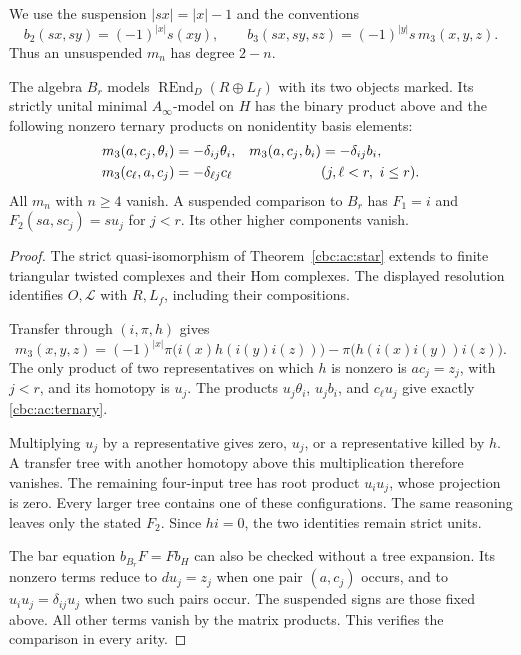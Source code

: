 We use the suspension $|sx|=|x|-1$ and the conventions
\[
 b_2(sx,sy)=(-1)^{|x|}s(xy),\qquad
 b_3(sx,sy,sz)=(-1)^{|y|}s\,m_3(x,y,z).
\]
Thus an unsuspended $m_n$ has degree $2-n$.

\begin{theorem}\label{cbc:ac:marked-model}
The algebra $B_r$ models
$\operatorname{REnd}_D(R\oplus L_f)$ with its two
objects marked. Its strictly unital minimal
$A_\infty$-model on $H$ has the binary product above
and the following nonzero ternary products on
nonidentity basis elements:
\begin{align}
 m_3(a,c_j,\theta_i)&=-\delta_{ij}\theta_i,&
 m_3(a,c_j,b_i)&=-\delta_{ij}b_i,\notag\\
 m_3(c_\ell,a,c_j)&=-\delta_{\ell j}c_\ell
        &&(j,\ell<r,\ i\leq r).
                  \label{cbc:ac:ternary}
\end{align}
All $m_n$ with $n\geq4$ vanish. A suspended comparison
to $B_r$ has $F_1=i$ and
$F_2(sa,sc_j)=su_j$ for $j<r$.
Its other higher components vanish.
\end{theorem}
\begin{proof}
The strict quasi-isomorphism of
Theorem~\ref{cbc:ac:star} extends to finite triangular
twisted complexes and their Hom complexes. The displayed
resolution identifies $O,\mathcal L$ with $R,L_f$,
including their compositions.

Transfer through $(i,\pi,h)$ gives
\[
 m_3(x,y,z)=(-1)^{|x|}
       \pi\bigl(i(x)h(i(y)i(z))\bigr)
       -\pi\bigl(h(i(x)i(y))i(z)\bigr).
\]
The only product of two representatives on which $h$
is nonzero is $ac_j=z_j$, with $j<r$, and its
homotopy is $u_j$. The products
$u_j\theta_i$, $u_jb_i$, and $c_\ell u_j$
give exactly \eqref{cbc:ac:ternary}.

Multiplying $u_j$ by a representative gives zero,
$u_j$, or a representative killed by $h$. A transfer
tree with another homotopy above this multiplication
therefore vanishes. The remaining four-input tree has
root product $u_i u_j$, whose projection is zero.
Every larger tree contains one of these configurations.
The same reasoning leaves only the stated $F_2$.
Since $hi=0$, the two identities remain strict units.

The bar equation $b_{B_r}F=Fb_H$ can also be checked
without a tree expansion. Its nonzero terms reduce
to $du_j=z_j$ when one pair $(a,c_j)$ occurs,
and to $u_i u_j=\delta_{ij}u_j$ when two such
pairs occur. The suspended signs are those fixed
above. All other terms vanish by the matrix products.
This verifies the comparison in every arity.
\end{proof}


